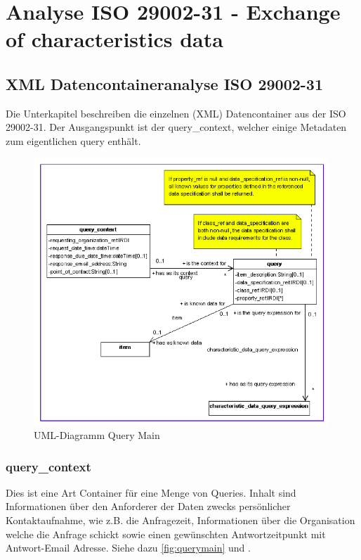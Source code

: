 \section{Analyse ISO 29002-31 - Exchange of characteristics data}


\subsection{XML Datencontaineranalyse ISO 29002-31}
Die Unterkapitel beschreiben die einzelnen (XML) Datencontainer aus der ISO 29002-31. Der Ausgangspunkt ist der query\_context, welcher einige Metadaten zum eigentlichen query enthält. 

\begin{figure}[htbp]
	\centering
		\includegraphics[width=0.99\textwidth]{images/query_main.png}
		\caption[UML-Diagramm Query Main]{UML-Diagramm Query Main\footnotemark}
	\label{fig:querymain}
\end{figure}

\subsubsection{query\_context}
Dies ist eine Art Container für eine Menge von Queries. Inhalt sind Informationen über den Anforderer der Daten zwecks persönlicher Kontaktaufnahme, wie z.B. die Anfragezeit, Informationen über die Organisation welche die Anfrage schickt sowie einen gewünschten Antwortzeitpunkt mit Antwort-Email Adresse. Siehe dazu \autoref{fig:querymain} und \citep[Kap. 5.2.2][]{iso29002-31}.  

